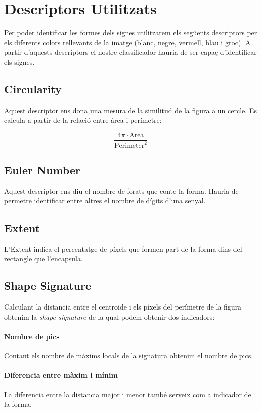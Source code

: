 
%



\section{Descriptors Utilitzats}%
\label{sec:desc}

Per poder identificar les formes dels signes utilitzarem els següents descriptors per els diferents
colors rellevants de la imatge (blanc, negre, vermell, blau i groc). A partir d'aquests descriptors
el nostre classificador hauria de ser capaç d'identificar els signes.

\subsection{Circularity}

Aquest descriptor ens dona una mesura de la similitud de la figura a un cercle. Es calcula a partir
de la relació entre àrea i perímetre:

\[
\frac{4\pi \cdot \text{Area}}{\text{Perimeter}^2}
\]

\subsection{Euler Number}

Aquest descriptor ens diu el nombre de forats que conte la forma. Hauria de permetre identificar entre
altres el nombre de dígits d'una senyal.

\subsection{Extent}

L'Extent indica el percentatge de píxels que formen part de la forma dins del rectangle que l'encapsula.

\subsection{Shape Signature}

Calculant la distancia entre el centroide i els píxels del perímetre de la figura obtenim la
\emph{shape signature} de la qual podem obtenir dos indicadors:

\paragraph{Nombre de pics} Contant els nombre de màxims locals de la signatura obtenim el nombre de pics.

\paragraph{Diferencia entre màxim i mínim} La diferencia entre la distancia major i menor també serveix com a indicador de la forma.
